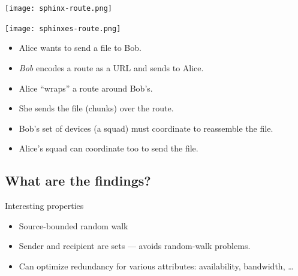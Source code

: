\begin{frame}
  \begin{center}
    \texttt{[image: sphinx-route.png]}
  \end{center}

  \begin{center}
    \texttt{[image: sphinxes-route.png]}
  \end{center}
\end{frame}

\begin{frame}
  \begin{example}[Scenario]
    \begin{itemize}
      \item Alice wants to send a file to Bob.
      \item \emph{Bob} encodes a route as a URL and sends to Alice.
      \item Alice \enquote{wraps} a route around Bob's.
      \item She sends the file (chunks) over the route.
    \end{itemize}
  \end{example}

  \pause

  \begin{remark}
    \begin{itemize}
      \item Bob's set of devices (a squad) must coordinate to reassemble the 
        file.
      \item Alice's squad can coordinate too to send the file.
    \end{itemize}
  \end{remark}
\end{frame}

\subsection{What are the findings?}

\begin{frame}
  \begin{block}{Interesting properties}
    \begin{itemize}
      \item Source-bounded random walk
      \item Sender and recipient are sets --- avoids random-walk problems.
      \item Can optimize redundancy for various attributes: availability, 
        bandwidth, \dots
    \end{itemize}
  \end{block}
\end{frame}


